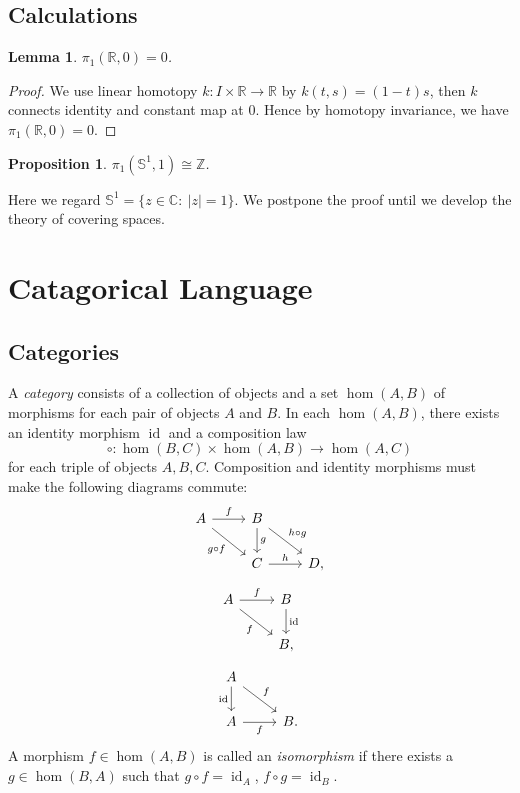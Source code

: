 \documentclass[a4paper]{amsart}
\theoremstyle{plain}
\newtheorem{prop}[thm]{Proposition}
\newtheorem{lem}[thm]{Lemma}
\theoremstyle{definition}
\theoremstyle{remark}
\begin{document}
\subsection{Calculations}
\begin{lem}
    $\pi_1(\mathbb{R},0)=0$.
\end{lem}
\begin{proof}
    We use linear homotopy $k:I\times\mathbb{R}\to\mathbb{R}$ by $k(t,s)=(1-t)s$, then $k$ connects identity and constant map at $0$.
    Hence by homotopy invariance, we have $\pi_1(\mathbb{R},0)=0$.
\end{proof}

\begin{prop}
    $\pi_1(\mathbb{S}^1,1)\cong\mathbb{Z}$.
\end{prop}
Here we regard $\mathbb{S}^1=\{z\in\mathbb{C}:\ |z|=1\}$.
We postpone the proof until we develop the theory of covering spaces.

\section{Catagorical Language}

\subsection{Categories}
A \emph{category} consists of a collection of objects and a set $\hom(A,B)$ of morphisms for each pair of objects $A$ and $B$.
In each $\hom(A,B)$, there exists an identity morphism $\operatorname{id}$ and a composition law
\[\circ:\hom(B,C)\times\hom(A,B)\to\hom(A,C)\]
for each triple of objects $A,B,C$.
Composition and identity morphisms must make the following diagrams commute:
\[\begin{tikzcd}
    A \ar[r, "f"] \ar[dr, "{g\circ f}"'] & B \ar[d, "g"] \ar[dr, "{h\circ g}"] \\
     & C \ar[r, "h"] & D,
\end{tikzcd}\]
\[\begin{tikzcd}
    A \ar[r, "f"] \ar[dr, "{f}"'] & B \ar[d, "{\operatorname{id}}"] \\
     & B,
\end{tikzcd}\]
\[\begin{tikzcd}
    A \ar[d,"{\operatorname{id}}"'] \ar[dr,"f"] & \\
    A \ar[r, "f"'] & B.
\end{tikzcd}\]
A morphism $f\in\hom(A,B)$ is called an \emph{isomorphism} if there exists a $g\in\hom(B,A)$ such that $g\circ f=\operatorname{id}_A$, $f\circ g=\operatorname{id}_B$.
\end{document}
